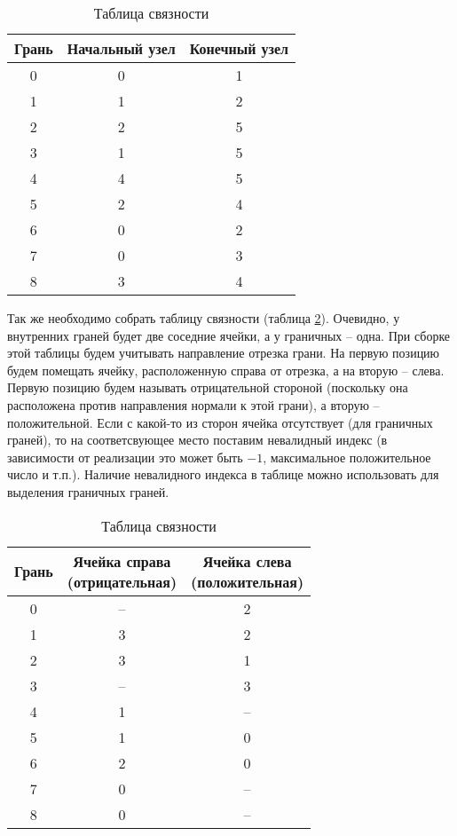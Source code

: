 \begin{table}[H]
\begin{center}
\begin{tabular}{c|c|c}
Грань & Начальный узел & Конечный узел \\
\hline
0 &  0 & 1\\
1 &  1 & 2\\
2 &  2 & 5\\
3 &  1 & 5\\
4 &  4 & 5\\
5 &  2 & 4\\
6 &  0 & 2\\
7 &  0 & 3\\
8 &  3 & 4\\
\end{tabular}
\caption{\label{tab:fvm_tab_face_point}Таблица связности }
\end{center}
\end{table}

Так же необходимо собрать таблицу связности  (таблица \ref{tab:fvm_tab_face_cell}). Очевидно,
у внутренних граней будет две соседние ячейки, а у граничных -- одна.
При сборке этой таблицы будем учитывать направление отрезка грани. На первую
позицию будем помещать ячейку, расположенную справа от отрезка, а на вторую -- слева.
Первую позицию будем называть отрицательной стороной (поскольку она расположена против направления
нормали к этой грани), а вторую -- положительной.
Если с какой-то из сторон ячейка отсутствует (для граничных граней),
то на соответсвующее место поставим невалидный индекс (в зависимости от реализации это может быть $-1$, максимальное положительное число и т.п.).
Наличие невалидного индекса в таблице  можно использовать для выделения граничных граней.

\begin{table}[H]
\begin{center}
\begin{tabular}{c|c|c}
Грань & \makecell{Ячейка справа \\ (отрицательная)} & \makecell{Ячейка слева \\ (положительная)}\\
\hline
0 &  -- & 2  \\
1 &  3  & 2  \\
2 &  3  & 1  \\
3 &  -- & 3  \\
4 &  1  & -- \\
5 &  1  & 0  \\
6 &  2  & 0  \\
7 &  0  & -- \\
8 &  0  & -- \\
\end{tabular}
\caption{\label{tab:fvm_tab_face_cell}Таблица связности }
\end{center}
\end{table}

